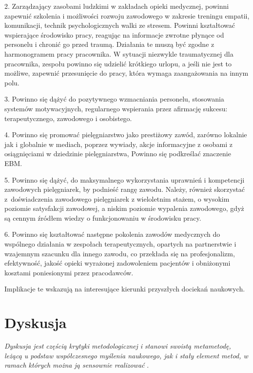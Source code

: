 \documentclass[a4paper,12pt,twoside,openright]{mwrep}
\begin{document}
2.	Zarządzający zasobami ludzkimi w zakładach opieki medycznej, powinni zapewnić szkolenia i możliwości rozwoju zawodowego w zakresie treningu empatii, komunikacji, technik psychologicznych walki ze stresem. Powinni kształtować wspierające środowisko pracy, reagując na informacje zwrotne płynące od personelu i chronić go przed traumą. Działania te muszą być zgodne z harmonogramem pracy pracownika. W sytuacji niezwykle traumatycznej dla pracownika, zespołu powinno się udzielić krótkiego urlopu, a jeśli nie jest to możliwe, zapewnić przesunięcie do pracy, która wymaga zaangażowania na innym polu.

3.	Powinno się dążyć do pozytywnego wzmacniania personelu, stosowania systemów motywacyjnych, regularnego wspierania przez afirmację sukcesu: terapeutycznego, zawodowego i osobistego.

4.	Powinno się promować pielęgniarstwo jako prestiżowy zawód, zarówno lokalnie jak i globalnie w mediach, poprzez wywiady, akcje informacyjne z osobami z osiągnięciami w dziedzinie pielęgniarstwa, Powinno się podkreślać znaczenie EBM.

5.	Powinno się dążyć, do maksymalnego wykorzystania uprawnień i kompetencji zawodowych pielęgniarek, by podnieść rangę zawodu. Należy, również skorzystać z~doświadczenia zawodowego pielęgniarek z wieloletnim stażem, o wysokim poziomie satysfakcji zawodowej, a niskim poziomie wypalenia zawodowego, gdyż są cennym źródłem wiedzy o funkcjonowaniu w środowisku pracy.

6. Powinno się kształtować następne pokolenia zawodów medycznych do  wspólnego działania w zespołach terapeutycznych, opartych na partnerstwie i wzajemnym szacunku dla innego zawodu, co przekłada się na profesjonalizm, efektywność, jakość opieki wyrażonej zadowoleniem pacjentów i obniżonymi kosztami poniesionymi przez pracodawców.


Implikacje te wskazują na interesujące kierunki przyszłych dociekań naukowych.


\section*{Dyskusja}
\textit{Dyskusja jest częścią krytyki metodologicznej i stanowi swoistą metametodę, leżącą u podstaw współczesnego myślenia naukowego, jak i stały element metod, w ramach których można ją sensownie realizować} \cite{krytyka}.
\end{document}
